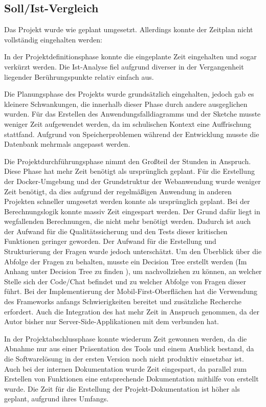 \subsection{Soll/Ist-Vergleich}

Das Projekt wurde wie geplant umgesetzt. Allerdings konnte der Zeitplan nicht vollständig eingehalten werden:

In der Projektdefinitionsphase konnte die eingeplante Zeit eingehalten und sogar verkürzt werden. Die Ist-Analyse fiel aufgrund diverser in der Vergangenheit liegender Berührungspunkte relativ einfach aus.

Die Planungsphase des Projekts wurde grundsätzlich eingehalten, jedoch gab es kleinere Schwankungen, die innerhalb dieser Phase durch andere ausgeglichen wurden. Für das Erstellen des Anwendungsfalldiagramms und der Sketche musste weniger Zeit aufgewendet werden, da im schulischen Kontext eine Auffrischung stattfand. Aufgrund von Speicherproblemen während der Entwicklung musste die Datenbank mehrmals angepasst werden.

Die Projektdurchführungsphase nimmt den Großteil der Stunden in Anspruch. Diese Phase hat mehr Zeit benötigt als ursprünglich geplant. Für die Erstellung der Docker-Umgebung und der Grundstruktur der Webanwendung wurde weniger Zeit benötigt, da dies aufgrund der regelmäßigen Anwendung in anderen Projekten schneller umgesetzt werden konnte als ursprünglich geplant. Bei der Berechnungslogik konnte massiv Zeit eingespart werden. Der Grund dafür liegt in wegfallenden Berechnungen, die nicht mehr benötigt werden. Dadurch ist auch der Aufwand für die Qualitätssicherung und den Tests dieser kritischen Funktionen geringer geworden. Der Aufwand für die Erstellung und Strukturierung der Fragen wurde jedoch unterschätzt. Um den Überblick über die Abfolge der Fragen zu behalten, musste ein Decision Tree erstellt werden (Im Anhang unter Decision Tree zu finden \todo), um nachvollziehen zu können, an welcher Stelle sich der Code/Chat befindet und zu welcher Abfolge von Fragen dieser führt. Bei der Implementierung der Mobil-First-Oberflächen hat die Verwendung des Frameworks  anfangs Schwierigkeiten bereitet und zusätzliche Recherche erfordert. Auch die Integration des  hat mehr Zeit in Anspruch genommen, da der Autor bisher nur Server-Side-Applikationen mit dem  verbunden hat. 

In der Projektabschlussphase konnte wiederum Zeit gewonnen werden, da die Abnahme nur aus einer Präsentation des Tools und einem Ausblick bestand, da die Softwarelösung in der ersten Version noch nicht produktiv einsetzbar ist. Auch bei der internen Dokumentation wurde Zeit eingespart, da parallel zum Erstellen von Funktionen eine entsprechende Dokumentation mithilfe von  erstellt wurde. Die Zeit für die Erstellung der Projekt-Dokumentation ist höher als geplant, aufgrund ihres Umfangs.

